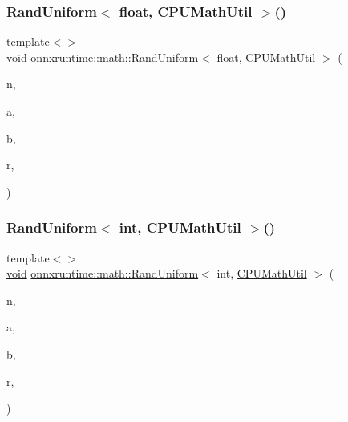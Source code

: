 \mbox{\label{namespaceonnxruntime_1_1math_a4b2f943a58a834387d4de84b8c2e5714}} 
\subsubsection{\texorpdfstring{Rand\+Uniform$<$ float, C\+P\+U\+Math\+Util $>$()}{RandUniform< float, CPUMathUtil >()}}
{\footnotesize\ttfamily template$<$$>$ \\
\mbox{\hyperlink{mlasi_8h_a88f941d423cb2a819b70a1358982b1a6}{void}} \mbox{\hyperlink{namespaceonnxruntime_1_1math_add24214b0bdbbeb482af602e0811f4a5}{onnxruntime\+::math\+::\+Rand\+Uniform}}$<$ float, \mbox{\hyperlink{classonnxruntime_1_1CPUMathUtil}{C\+P\+U\+Math\+Util}} $>$ (\begin{DoxyParamCaption}\item[{const int}]{n,  }\item[{const float}]{a,  }\item[{const float}]{b,  }\item[{float $\ast$}]{r,  }\item[{\mbox{\hyperlink{classonnxruntime_1_1CPUMathUtil}{C\+P\+U\+Math\+Util}} $\ast$}]{ }\end{DoxyParamCaption})}

\mbox{\label{namespaceonnxruntime_1_1math_ac5ce151c45379ea7490c0d9700d88749}} 
\subsubsection{\texorpdfstring{Rand\+Uniform$<$ int, C\+P\+U\+Math\+Util $>$()}{RandUniform< int, CPUMathUtil >()}}
{\footnotesize\ttfamily template$<$$>$ \\
\mbox{\hyperlink{mlasi_8h_a88f941d423cb2a819b70a1358982b1a6}{void}} \mbox{\hyperlink{namespaceonnxruntime_1_1math_add24214b0bdbbeb482af602e0811f4a5}{onnxruntime\+::math\+::\+Rand\+Uniform}}$<$ int, \mbox{\hyperlink{classonnxruntime_1_1CPUMathUtil}{C\+P\+U\+Math\+Util}} $>$ (\begin{DoxyParamCaption}\item[{const int}]{n,  }\item[{const int}]{a,  }\item[{const int}]{b,  }\item[{int $\ast$}]{r,  }\item[{\mbox{\hyperlink{classonnxruntime_1_1CPUMathUtil}{C\+P\+U\+Math\+Util}} $\ast$}]{ }\end{DoxyParamCaption})}

